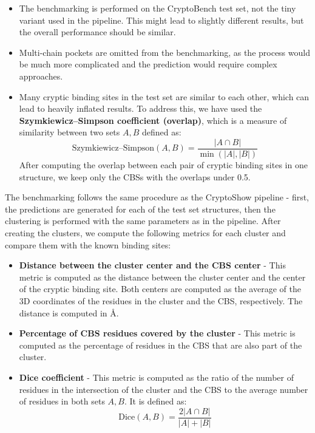 \begin{itemize}
    \item The benchmarking is performed on the CryptoBench test set, not the tiny variant used in the pipeline. This might lead to slightly different results, but the overall performance should be similar.
    \item Multi-chain pockets are omitted from the benchmarking, as the process would be much more complicated and the prediction would require complex approaches.
    \item Many cryptic binding sites in the test set are similar to each other, which can lead to heavily inflated results. To address this, we have used the \textbf{Szymkiewicz–Simpson coefficient (overlap)}, which is a measure of similarity between two sets $A, B$ defined as:
    \begin{equation}
        \text{Szymkiewicz–Simpson}(A, B) = \frac{|A \cap B|}{\min(|A|, |B|)}
    \end{equation}
    After computing the overlap between each pair of cryptic binding sites in one structure, we keep only the CBSs with the overlaps under 0.5.
\end{itemize}

The benchmarking follows the same procedure as the CryptoShow pipeline - first, the predictions are generated for each of the test set structures, then the clustering is performed with the same parameters as in the pipeline. After creating the clusters, we compute the following metrics for each cluster and compare them with the known binding sites:

\begin{itemize}
    \item \textbf{Distance between the cluster center and the CBS center} - This metric is computed as the distance between the cluster center and the center of the cryptic binding site. Both centers are computed as the average of the 3D coordinates of the residues in the cluster and the CBS, respectively. The distance is computed in \AA.
    \item \textbf{Percentage of CBS residues covered by the cluster} - This metric is computed as the percentage of residues in the CBS that are also part of the cluster.
    \item \textbf{Dice coefficient} - This metric is computed as the ratio of the number of residues in the intersection of the cluster and the CBS to the average number of residues in both sets $A, B$. It is defined as:
    \begin{equation}
        \text{Dice}(A, B) = \frac{2 |A \cap B|}{|A| + |B|}
    \end{equation}
\end{itemize}

